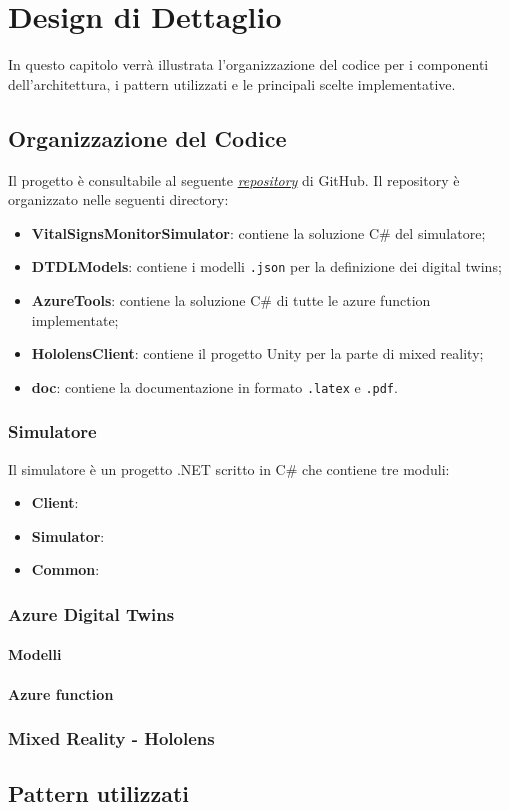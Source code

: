 \chapter{Design di Dettaglio}
 \label{chap:detailed-design}
In questo capitolo verrà illustrata l'organizzazione del codice per i componenti dell'architettura, i pattern utilizzati e le principali scelte implementative.

\section{Organizzazione del Codice}

Il progetto è consultabile al seguente \href{https://github.com/lucagiorgettismp/AzureHealthcareDigitalTwins}{\textit{repository}} di GitHub. Il repository è organizzato nelle seguenti directory:

\begin{itemize}

    \item \textbf{VitalSignsMonitorSimulator}: contiene la soluzione C\# del simulatore;
    
    \item \textbf{DTDLModels}: contiene i modelli \texttt{.json} per la definizione dei digital twins;
    
    \item \textbf{AzureTools}: contiene la soluzione C\# di tutte le azure function implementate;

    \item \textbf{HololensClient}: contiene il progetto Unity per la parte di mixed reality;
        
    \item \textbf{doc}: contiene la documentazione in formato \texttt{.latex} e \texttt{.pdf}.
\end{itemize}

\subsection{Simulatore}
Il simulatore è un progetto .NET scritto in C\# che contiene tre moduli:
\begin{itemize}
    \item \textbf{Client}:
    \item \textbf{Simulator}:
    \item \textbf{Common}: 
\end{itemize}

\subsection{Azure Digital Twins}

\subsubsection{Modelli}

\subsubsection{Azure function}

\subsection{Mixed Reality - Hololens}

\section{Pattern utilizzati}